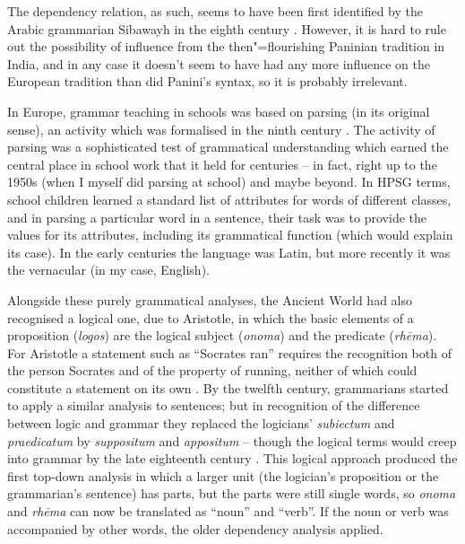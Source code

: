 \documentclass[output=paper
	        ,collection
	        ,collectionchapter
 	        ,biblatex
                ,babelshorthands
                ,newtxmath
                ,draftmode
                ,colorlinks, citecolor=brown
]{./langsci/langscibook}
\begin{document}
The dependency relation, as such, seems to have been first identified by the Arabic grammarian Sibawayh in the eighth century \citep{Owens1988,Kouloughli1999}. However, it is hard to rule out the possibility of influence from the then"=flourishing Paninian tradition in India, and in any case it doesn’t seem to have had any more influence on the European tradition than did Panini’s syntax, so it is probably irrelevant.

In Europe, grammar teaching in schools was based on parsing (in its original sense), an activity which was formalised in the ninth century \citep{Luhtala1994}. The activity of parsing was a sophisticated test of grammatical understanding which earned the central place in school work that it held for centuries – in fact, right up to the 1950s (when I myself did parsing at school) and maybe beyond. In HPSG terms, school children learned a standard list of attributes for words of different classes, and in parsing a particular word in a sentence, their task was to provide the values for its attributes, including its grammatical function (which would explain its case). In the early centuries the language was Latin, but more recently it was the vernacular (in my case, English).

Alongside these purely grammatical analyses, the Ancient World had also recognised a logical one, due to Aristotle, in which the basic elements of a proposition (\emph{logos}) are the logical subject (\emph{onoma}) and the predicate (\emph{rhēma}). For Aristotle a statement such as ``Socrates ran'' requires the recognition both of the person Socrates and of the property of running, neither of which could constitute a statement on its own \citep[30–31]{Law2003}. By the twelfth century, grammarians started to apply a similar analysis to sentences; but in recognition of the difference between logic and grammar they replaced the logicians’ \emph{subiectum} and \emph{praedicatum} by \emph{suppositum} and \emph{appositum} – though the logical terms would creep into grammar by the late eighteenth century \citep[168]{Law2003}. This logical approach produced the first top-down analysis in which a larger unit (the logician’s proposition or the grammarian’s sentence) has parts, but the parts were still single words, so \emph{onoma} and \emph{rhēma} can now be translated as ``noun'' and ``verb''. If the noun or verb was accompanied by other words, the older dependency analysis applied.
\end{document}

